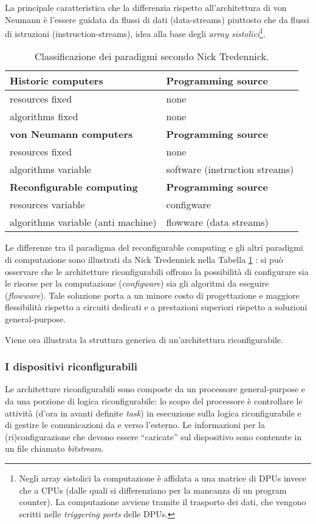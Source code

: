 La principale caratteristica che la differenzia rispetto all'architettura di von Neumann è
l'essere guidata da flussi di dati (data-streams) piuttosto che da flussi di istruzioni
(instruction-streams), idea alla base degli \emph{array sistolici}\footnote{Negli array
sistolici la computazione è affidata a una matrice di \acp{DPU} invece che a \acsp{CPU}
(dalle quali si differenziano per la mancanza di un program counter). La computazione
avviene tramite il trasporto dei dati, che vengono scritti nelle \emph{triggering ports}
delle \acp{DPU}.}.

\begin{table}[ht]
\caption{Classificazione dei paradigmi secondo Nick Tredennick.}
\label{tab:TredennickClassificationScheme}
 \begin{tabular}{l | l}
 \hline
 \textbf{Historic computers} & \textbf{Programming source}\\
 \hline
 resources fixed & none\\
 algorithms fixed & none\\
 \hline
 \textbf{von Neumann computers} & \textbf{Programming source}\\
 \hline
 resources fixed & none\\
 algorithms variable & software (instruction streams)\\
 \hline
 \textbf{Reconfigurable computing} & \textbf{Programming source}\\
 \hline
 resources variable & configware\\
 algorithms variable (anti machine) & flowware (data streams)
 \end{tabular}
\end{table}

Le differenze tra il paradigma del reconfigurable computing e gli altri paradigmi di
computazione sono illustrati da Nick Tredennick nella Tabella
\ref{tab:TredennickClassificationScheme} \cite{TredennickClassification}: si può
osservare che le architetture riconfigurabili offrono la possibilità di configurare sia le
risorse per la computazione (\emph{configware}) sia gli algoritmi da eseguire
(\emph{flowware}). Tale soluzione porta a un minore costo di progettazione e
maggiore flessibilità rispetto a circuiti dedicati e a prestazioni superiori rispetto a
soluzioni general-purpose.

Viene ora illustrata la struttura generica di un'architettura riconfigurabile.

\subsubsection{I dispositivi riconfigurabili}
Le architetture riconfigurabili sono composte da un processore general-purpose e da una
porzione di logica riconfigurabile: lo scopo del processore è controllare le
attività (d'ora in avanti definite \emph{task}) in esecuzione sulla logica
riconfigurabile e di gestire le comunicazioni da e verso l'esterno. Le informazioni per la
(ri)configurazione che devono essere ``caricate'' sul dispositivo sono contenute in un
file chiamato \emph{bitstream}.

